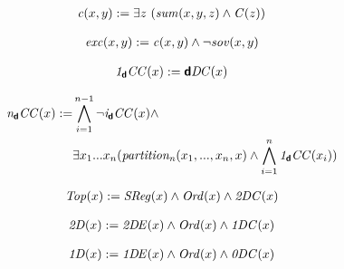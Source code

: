 \begin{erin}
    \begin{align*}
        \mathit{c}(x,y) := \exists z\ (\mathit{sum}(x,y,z) \wedge \mathit{C}(z))
    \end{align*}
\end{erin}

\begin{erin}
    \begin{align*}
        \mathit{exc}(x,y) := \mathit{c}(x,y) \wedge \neg\mathit{sov}(x,y)
    \end{align*}
\end{erin}

\begin{erin}
    \begin{align*}
        \mathit{1}_{\boldsymbol{\mathsf{d}}}\mathit{CC}(x) := \mathit{\boldsymbol{\mathsf{d}}D\hspace*{-0.25ex} C}(x)
    \end{align*}
\end{erin}

\begin{erin}
    \begin{align*}
        \mathit{n}_{\boldsymbol{\mathsf{d}}}\mathit{CC}(x) := &\bigwedge_{i=1}^{n-1} \neg\mathit{i}_{\boldsymbol{\mathsf{d}}}\mathit{CC}(x) \wedge\\
                    &\exists x_{1}...x_{n}(\mathit{partition_{n}}(x_{1},...,x_{n},x)
                    \wedge \bigwedge_{i=1}^{n} \mathit{1}_{\boldsymbol{\mathsf{d}}}\mathit{CC}(x_{i}))
    \end{align*}
\end{erin}

\begin{erin}
    \begin{align*}
        \mathit{Top}(x) := \mathit{S\hspace*{-0.25ex}Reg}(x) \wedge \mathit{Ord}(x) \wedge \mathit{2DC}(x)
    \end{align*}
\end{erin}

\begin{erin}
    \begin{align*}
        \mathit{2D}(x) := \mathit{2D\hspace*{-0.25ex} E}(x) \wedge \mathit{Ord}(x) \wedge \mathit{1DC}(x)
    \end{align*}
\end{erin}

\begin{erin}
    \begin{align*}
        \mathit{1D}(x) := \mathit{1D\hspace*{-0.25ex} E}(x) \wedge \mathit{Ord}(x) \wedge \mathit{0DC}(x)
    \end{align*}
\end{erin}

